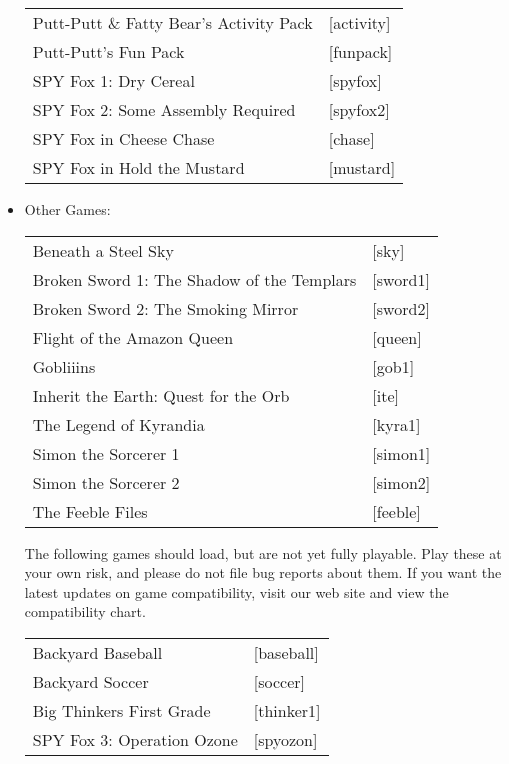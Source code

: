 \begin{itemize}
\begin{tabular}[h]{ll}
    Putt-Putt \& Fatty Bear's Activity Pack&                       [activity]\\
    Putt-Putt's Fun Pack&                                          [funpack]\\
    SPY Fox 1: Dry Cereal&                                         [spyfox]\\
    SPY Fox 2: Some Assembly Required&                             [spyfox2]\\
    SPY Fox in Cheese Chase&                                       [chase]\\
    SPY Fox in Hold the Mustard&                                   [mustard]\\
  \end{tabular}
\item Other Games:\\ 
  \begin{tabular}[h]{ll}
    Beneath a Steel Sky&                           [sky]\\
    Broken Sword 1: The Shadow of the Templars&    [sword1]\\
    Broken Sword 2: The Smoking Mirror&            [sword2]\\
    Flight of the Amazon Queen&                    [queen]\\
    Gobliiins&                                     [gob1]\\
    Inherit the Earth: Quest for the Orb&          [ite]\\
    The Legend of Kyrandia&                        [kyra1]\\
    Simon the Sorcerer 1&                          [simon1]\\
    Simon the Sorcerer 2&                          [simon2]\\
    The Feeble Files&                              [feeble]\\
  \end{tabular}

  The following games should load, but are not yet fully playable. Play these at your own risk, and please do not file bug reports about them. If you want
the latest updates on game compatibility, visit our web site and view the
compatibility chart.

\begin{tabular}{ll}
  Backyard Baseball&                               [baseball]\\
  Backyard Soccer&                                 [soccer]\\
  Big Thinkers First Grade&                        [thinker1]\\
  SPY Fox 3: Operation Ozone&                      [spyozon]\\
\end{tabular}


\end{itemize}
